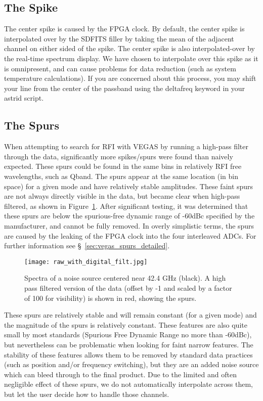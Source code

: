 \subsection{The Spike}
\label{sec:vegas_spike}
The center spike is caused by the \gls{FPGA} clock. By default, the
center spike  is interpolated over by the SDFITS filler by taking the
mean of the adjacent channel on either sided of the spike. The center spike
is also interpolated-over by the real-time spectrum display. We have chosen
to interpolate over this spike as it is omnipresent, and can cause problems 
for data reduction (such as system temperature calculations).
If you are concerned about this process, you may shift your line from the 
center of the passband using the deltafreq keyword in your astrid script.

\subsection{The Spurs}
When attempting to search for \gls{RFI} with VEGAS by running a high-pass
filter through the data, significantly more spikes/spurs were found than
naively expected. These spurs could be found in the same bins in relatively
\gls{RFI} free wavelengths, such as \gls{Qband}. The spurs appear at the same
location (in bin space) for a given mode and have relatively stable
amplitudes. These faint spurs are not always directly visible in the data,
but became clear when high-pass filtered, as shown in
Figure~\ref{fig:vegas_spurs}. After significant testing, it was determined
that these spurs are below the spurious-free dynamic range of -60dBc
specified by the manufacturer, and cannot be fully removed.
In overly simplistic terms, the spurs are caused by the leaking of the 
\gls{FPGA} clock into the four interleaved \glspl{ADC}.  For further
information see \S~\ref{sec:vegas_spurs_detailed}.

\begin{figure}[!h]
\begin{center}
\texttt{[image: raw\_with\_digital\_filt.jpg]}
\caption[VEGAS spurs]{Spectra of a noise source centered near 42.4 GHz (black). 
A high pass filtered version of the data (offset by -1 and scaled by a 
factor of 100 for visibility) is shown in red, showing the spurs.}
\label{fig:vegas_spurs}
\end{center}
\end{figure}

These spurs are relatively stable and will remain constant 
(for a given mode) and the magnitude of the spurs is relatively constant. 
These features are also quite small by most standards (Spurious Free 
Dynamic Range no more than -60dBc), but nevertheless can be problematic 
when looking for faint narrow features. The stability of these features 
allows them to be removed by standard data practices (such as position 
and/or frequency switching), but they are an added noise source which can 
bleed through to the final product. Due to the limited and often 
negligible effect of these spurs, we do not automatically interpolate across 
them, but let the user decide how to handle those channels.

